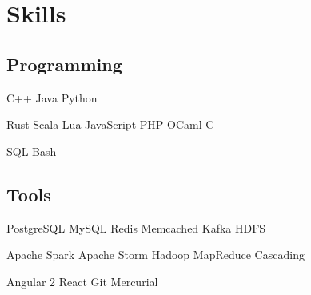 \documentclass[]{resume}
\begin{document}
\begin{minipage}[t]{0.33\textwidth}
\sectionsep


\section{Skills}

\subsection{Programming}

C++ \textbullet{} Java \textbullet{} Python

Rust \textbullet{} Scala \textbullet{} Lua \textbullet{} JavaScript \textbullet{} PHP
\textbullet{} OCaml \textbullet{} C

SQL \textbullet{} Bash

\sectionsep

\subsection{Tools}

PostgreSQL \textbullet{} MySQL \textbullet{} Redis \textbullet{} Memcached
\textbullet{} Kafka \textbullet{} HDFS

Apache Spark \textbullet{} Apache Storm \textbullet{} Hadoop MapReduce
\textbullet{} Cascading

Angular 2 \textbullet{} React \textbullet{} Git \textbullet{} Mercurial

\sectionsep

%
%

\end{minipage}
\hfill
\end{document}
